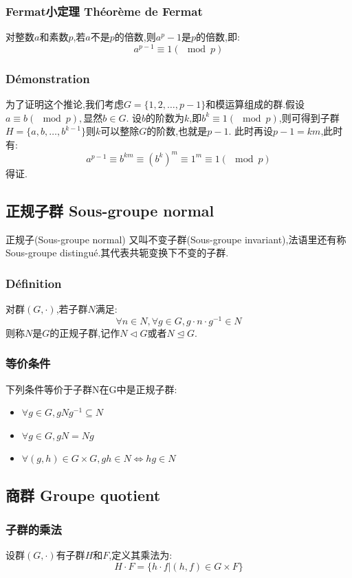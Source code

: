 \documentclass[12pt, a4paper, oneside]{ctexbook}
\begin{document}
  \subsubsection{Fermat小定理 Théorème de Fermat}
  对整数$a$和素数$p$,若$a$不是$p$的倍数,则$a^p-1$是$p$的倍数,即:
  $$
    a^{p-1}\equiv 1(\mod p)
  $$
  \subsubsection{Démonstration}
  为了证明这个推论,我们考虑$G=\{1,2,\dots , p-1\}$和模运算组成的群.假设$a\equiv b(\mod p),\text{显然}b\in G$.
  设$b$的阶数为$k$,即$b^k\equiv 1(\mod p)$,则可得到子群$H=\{a,b,\dots ,b^{k-1}\}$则$k$可以整除$G$的阶数,也就是$p-1$.
  此时再设$p-1=km$,此时有:
  $$
    a^{p-1}\equiv b^{km}\equiv (b^k)^m\equiv 1^m\equiv 1(\mod p)
  $$得证.
  \subsection{正规子群 Sous-groupe normal}
  正规子(Sous-groupe normal) 又叫不变子群(Sous-groupe invariant),法语里还有称Sous-groupe distingué.其代表共轭变换下不变的子群.
  \subsubsection{Définition}
  对群$(G,\cdot)$,若子群$N$满足:
  $$
  \forall n\in N,\forall g\in G,g\cdot n\cdot g^{-1}\in N
  $$则称$N$是$G$的正规子群,记作$N\lhd G$或者$N\unlhd G$.
  \subsubsection{等价条件}
  下列条件等价于子群N在G中是正规子群:
  \begin{itemize}
    \item $\forall g\in G,gNg^{-1}\subseteq N $
    \item $\forall g\in G,gN=Ng $
    \item $\forall (g,h)\in G\times G,gh\in N\Leftrightarrow hg\in N$
  \end{itemize}


  \subsection{商群 Groupe quotient}
  \subsubsection{子群的乘法}
  设群$(G,\cdot)\text{有子群}H\text{和}F$,定义其乘法为:
  $$
  H\cdot F=\{h\cdot f|(h,f)\in G\times F \}
  $$
\end{document}
